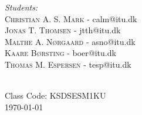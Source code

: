 \begin{titlepage}

\begin{minipage}{0.6\textwidth}
\center
\emph{Students:}\\
\textsc{Christian A. S. Mark} - calm@itu.dk\\
\textsc{Jonas T. Thomsen} - jtth@itu.dk\\ \textsc{Malthe A. Nørgaard} - asno@itu.dk\\ \textsc{Kaare Børsting} - boer@itu.dk\\ \textsc{Thomas M. Espersen} - tesp@itu.dk\\


\end{minipage}\\[2cm]



Class Code: KSDSESM1KU\\
{\large \today}\\[2cm] %

\vfill %

\end{titlepage}
